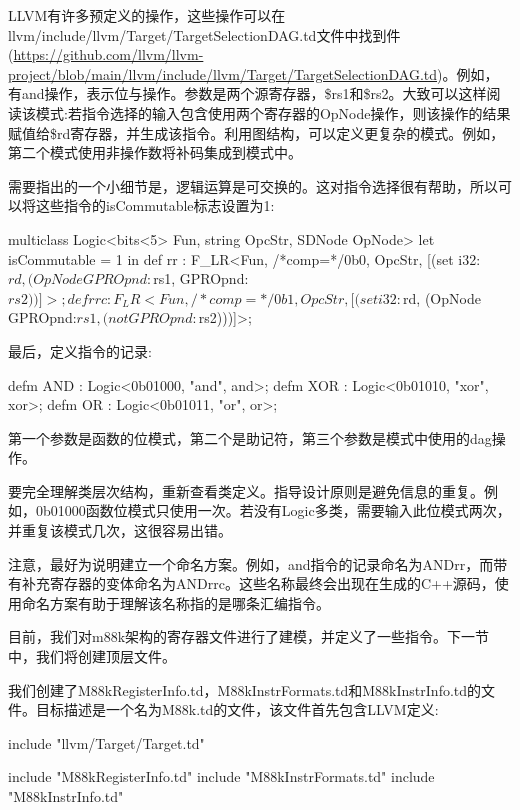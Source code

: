 LLVM有许多预定义的操作，这些操作可以在llvm/include/llvm/Target/TargetSelectionDAG.td文件中找到件(\url{https://github.com/llvm/llvm-project/blob/main/llvm/include/llvm/Target/TargetSelectionDAG.td})。例如，有and操作，表示位与操作。参数是两个源寄存器，\$rs1和\$rs2。大致可以这样阅读该模式:若指令选择的输入包含使用两个寄存器的OpNode操作，则该操作的结果赋值给\$rd寄存器，并生成该指令。利用图结构，可以定义更复杂的模式。例如，第二个模式使用非操作数将补码集成到模式中。

需要指出的一个小细节是，逻辑运算是可交换的。这对指令选择很有帮助，所以可以将这些指令的isCommutable标志设置为1:

\begin{cpp}
multiclass Logic<bits<5> Fun, string OpcStr, SDNode OpNode> {
    let isCommutable = 1 in
    def rr : F_LR<Fun, /*comp=*/0b0, OpcStr,
                    [(set i32:$rd,
                    (OpNode GPROpnd:$rs1, GPROpnd:$rs2))]>;
    def rrc : F_LR<Fun, /*comp=*/0b1, OpcStr,
                    [(set i32:$rd,
                    (OpNode GPROpnd:$rs1, (not GPROpnd:$rs2)))]>;
}
\end{cpp}

最后，定义指令的记录:

\begin{cpp}
defm AND : Logic<0b01000, "and", and>;
defm XOR : Logic<0b01010, "xor", xor>;
defm OR : Logic<0b01011, "or", or>;
\end{cpp}

第一个参数是函数的位模式，第二个是助记符，第三个参数是模式中使用的dag操作。

要完全理解类层次结构，重新查看类定义。指导设计原则是避免信息的重复。例如，0b01000函数位模式只使用一次。若没有Logic多类，需要输入此位模式两次，并重复该模式几次，这很容易出错。

注意，最好为说明建立一个命名方案。例如，and指令的记录命名为ANDrr，而带有补充寄存器的变体命名为ANDrrc。这些名称最终会出现在生成的C++源码，使用命名方案有助于理解该名称指的是哪条汇编指令。

目前，我们对m88k架构的寄存器文件进行了建模，并定义了一些指令。下一节中，我们将创建顶层文件。


我们创建了M88kRegisterInfo.td，M88kInstrFormats.td和M88kInstrInfo.td的文件。目标描述是一个名为M88k.td的文件，该文件首先包含LLVM定义:

\begin{cpp}
include "llvm/Target/Target.td"

include "M88kRegisterInfo.td"
include "M88kInstrFormats.td"
include "M88kInstrInfo.td"
\end{cpp}

